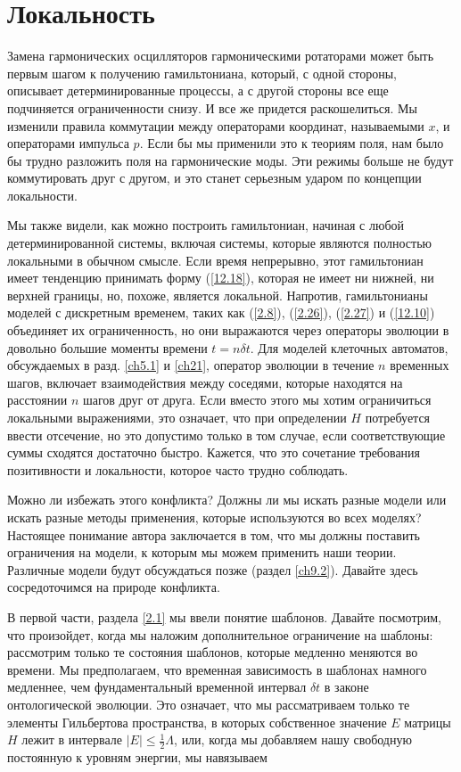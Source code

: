 \documentclass[main.tex]{subfiles}
\begin{document}
\section{Локальность}\label{ch14}

Замена гармонических осцилляторов гармоническими ротаторами может быть первым шагом к получению гамильтониана, который, с одной стороны, описывает детерминированные процессы, а с другой стороны все еще подчиняется ограниченности снизу. И все же придется раскошелиться. Мы изменили правила коммутации между операторами координат, называемыми $x$, и операторами импульса $p$. Если бы мы применили это к теориям поля, нам было бы трудно разложить поля на гармонические моды. Эти режимы больше не будут коммутировать друг с другом, и это станет серьезным ударом по концепции локальности.

Мы также видели, как можно построить гамильтониан, начиная с любой детерминированной системы, включая системы, которые являются полностью локальными в обычном смысле. Если время непрерывно, этот гамильтониан имеет тенденцию принимать форму (\ref{12.18}), которая не имеет ни нижней, ни верхней границы, но, похоже, является локальной. Напротив, гамильтонианы моделей с дискретным временем, таких как (\ref{2.8}), (\ref{2.26}), (\ref{2.27}) и (\ref{12.10}) объединяет их ограниченность, но они выражаются через операторы эволюции в довольно большие моменты времени $t = n\delta t$. Для моделей клеточных автоматов, обсуждаемых в разд. \ref{ch5.1} и \ref{ch21}, оператор эволюции в течение $n$ временных шагов, включает взаимодействия между соседями, которые находятся на расстоянии $n$ шагов друг от друга. Если вместо этого мы хотим ограничиться локальными выражениями, это означает, что при определении $H$ потребуется ввести отсечение, но это допустимо только в том случае, если соответствующие суммы сходятся достаточно быстро. Кажется, что это сочетание требования позитивности и локальности, которое часто трудно соблюдать.

Можно ли избежать этого конфликта? Должны ли мы искать разные модели или искать разные методы применения, которые используются во всех моделях? Настоящее понимание автора заключается в том, что мы должны поставить ограничения на модели, к которым мы можем применить наши теории. Различные модели будут обсуждаться позже (раздел \ref{ch9.2}). Давайте здесь сосредоточимся на природе конфликта.

В первой части, раздела \ref{2.1} мы ввели понятие шаблонов. Давайте посмотрим, что произойдет, когда мы наложим дополнительное ограничение на шаблоны: рассмотрим только те состояния шаблонов, которые медленно меняются во времени. Мы предполагаем, что временная зависимость в шаблонах намного медленнее, чем фундаментальный временной интервал $\delta t$ в законе онтологической эволюции. Это означает, что мы рассматриваем только те элементы Гильбертова пространства, в которых собственное значение $E$ матрицы $H$ лежит в интервале $|E|\le\frac 1 2 \Lambda$, или, когда мы добавляем нашу свободную постоянную к уровням энергии, мы навязываем
\end{document}
